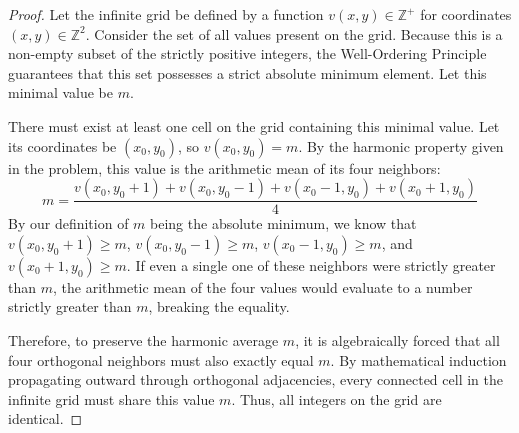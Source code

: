 \documentclass[11pt, a4paper]{article}
\theoremstyle{definition}
\theoremstyle{plain}
\begin{document}
\begin{proof}
Let the infinite grid be defined by a function $v(x, y) \in \mathbb{Z}^+$ for coordinates $(x, y) \in \mathbb{Z}^2$.
Consider the set of all values present on the grid. Because this is a non-empty subset of the strictly positive integers, the Well-Ordering Principle guarantees that this set possesses a strict absolute minimum element. Let this minimal value be $m$.

There must exist at least one cell on the grid containing this minimal value. Let its coordinates be $(x_0, y_0)$, so $v(x_0, y_0) = m$.
By the harmonic property given in the problem, this value is the arithmetic mean of its four neighbors:
\[
m = \frac{v(x_0, y_0+1) + v(x_0, y_0-1) + v(x_0-1, y_0) + v(x_0+1, y_0)}{4}
\]
By our definition of $m$ being the absolute minimum, we know that $v(x_0, y_0+1) \ge m$, $v(x_0, y_0-1) \ge m$, $v(x_0-1, y_0) \ge m$, and $v(x_0+1, y_0) \ge m$.
If even a single one of these neighbors were strictly greater than $m$, the arithmetic mean of the four values would evaluate to a number strictly greater than $m$, breaking the equality. 

Therefore, to preserve the harmonic average $m$, it is algebraically forced that all four orthogonal neighbors must also exactly equal $m$. 
By mathematical induction propagating outward through orthogonal adjacencies, every connected cell in the infinite grid must share this value $m$. Thus, all integers on the grid are identical.
\end{proof}
\end{document}
